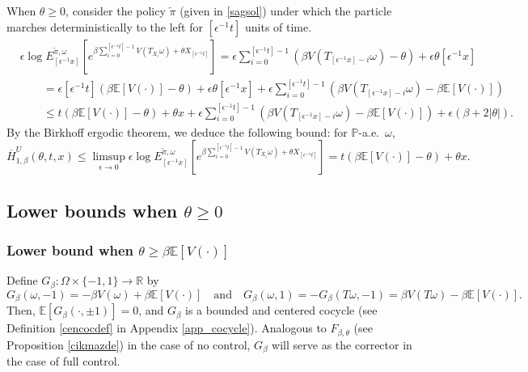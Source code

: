\documentclass[a4paper]{amsart}
\numberwithin{equation}{section}
\theoremstyle{plain}
\theoremstyle{remark}
\begin{document}
When $\theta\ge 0$, consider the policy ${\overleftarrow\pi}$ (given in \eqref{sagsol}) under which the particle marches deterministically to the left for $[{\epsilon^{-1}} t]$ units of time. 
\begin{equation}
\begin{aligned}\label{fuatoz}
&{\epsilon}\log E_{[{\epsilon^{-1}} x]}^{{\overleftarrow\pi},\omega}\left[e^{\beta\sum_{i=0}^{[{\epsilon^{-1}} t]-1}V(T_{X_i}\omega) + \theta X_{[{\epsilon^{-1}} t]}}\right] = {\epsilon}\sum_{i=0}^{[{\epsilon^{-1}} t] - 1}(\beta V(T_{[{\epsilon^{-1}} x] - i}\omega) - \theta) +  {\epsilon}\theta[{\epsilon^{-1}} x]\\
&\qquad = {\epsilon} [{\epsilon^{-1}} t](\beta\mathbb{E}[V(\cdot)] - \theta) + {\epsilon}\theta[{\epsilon^{-1}} x] + {\epsilon}\sum_{i=0}^{[{\epsilon^{-1}} t] - 1}(\beta V(T_{[{\epsilon^{-1}} x] - i}\omega) - \beta\mathbb{E}[V(\cdot)])\\
&\qquad \le t(\beta\mathbb{E}[V(\cdot)] - \theta) + \theta x + {\epsilon}\sum_{i=0}^{[{\epsilon^{-1}} t] - 1}(\beta V(T_{[{\epsilon^{-1}} x] - i}\omega) - \beta\mathbb{E}[V(\cdot)]) + {\epsilon}(\beta + 2|\theta|).
\end{aligned}
\end{equation}
By the Birkhoff ergodic theorem, we deduce the following bound: for $\mathbb{P}$-a.e.\ $\omega$,
\begin{equation}\label{UBfull2}
\overline H_{1,\beta}^U(\theta,t,x) \le \limsup_{{\epsilon}\to0}{\epsilon}\log E_{[{\epsilon^{-1}} x]}^{{\overleftarrow\pi},\omega}\left[e^{\beta\sum_{i=0}^{[{\epsilon^{-1}} t]-1}V(T_{X_i}\omega) + \theta X_{[{\epsilon^{-1}} t]}}\right] = t(\beta\mathbb{E}[V(\cdot)] - \theta) + \theta x.
\end{equation}

\subsection{Lower bounds when $\theta\ge 0$}\label{lovirband}

\subsubsection{Lower bound when $\theta\ge\beta\mathbb{E}[V(\cdot)]$}

Define $G_\beta:\Omega\times\{-1,1\}\to\mathbb{R}$ by
\begin{equation}\label{ptesi}
G_\beta(\omega,-1) = -\beta V(\omega) + \beta\mathbb{E}[V(\cdot)]\quad\text{and}\quad G_\beta(\omega,1) = - G_\beta(T\omega,-1) = \beta V(T\omega) - \beta\mathbb{E}[V(\cdot)].
\end{equation}
Then, $\mathbb{E}[G_\beta(\cdot,\pm 1)] = 0$, and $G_\beta$ is a bounded and centered cocycle (see Definition \ref{cencocdef} in Appendix \ref{app_cocycle}).
Analogous to $F_{\beta,\theta}$ (see Proposition \ref{cikmazde}) in the case of no control, $G_\beta$ will serve as the corrector in the case of full control.
\end{document}

